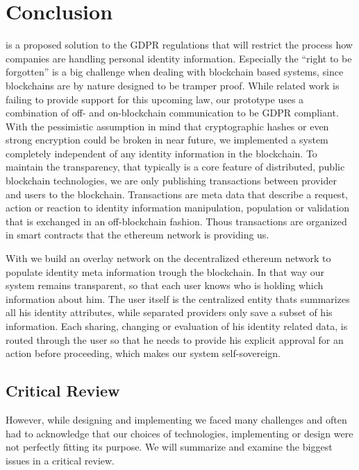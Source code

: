 \chapter{Conclusion}
\label{cha:conclusion}

\projectName{} is a proposed solution to the GDPR regulations that will restrict the process how companies are handling personal identity information. Especially the “right to be forgotten” is a big challenge when dealing with blockchain based systems, since blockchains are by nature designed to be tramper proof. While related work is failing to provide support for this upcoming law, our prototype uses a combination of off- and on-blockchain communication to be GDPR compliant. With the pessimistic assumption in mind that cryptographic hashes or even strong encryption could be broken in near future, we implemented a system completely independent of any identity information in the blockchain. To maintain the transparency, that typically is a core feature of  distributed, public blockchain technologies, we are only publishing transactions between provider and users to the blockchain. Transactions are meta data that describe a request, action or reaction to identity information manipulation, population or validation that is exchanged in an off-blockchain fashion.  Thous transactions are organized in smart contracts that the ethereum network is providing us. 

With \projectName{} we build an overlay network on the decentralized ethereum network to populate identity meta information trough the blockchain. In that way our system remains transparent, so that each user knows who is holding which information about him. The user itself is the centralized entity thats summarizes all his identity attributes, while separated providers only save a subset of his information. Each sharing, changing or evaluation of his identity related data, is routed through the user so that he needs to provide his explicit approval for an action before proceeding, which makes our system self-sovereign.

\section{Critical Review}

However, while designing and implementing \projectName{} we faced many challenges and often had to acknowledge that our choices of technologies, implementing or design were not perfectly fitting its purpose. We will summarize and examine the biggest issues in a critical review.
 
